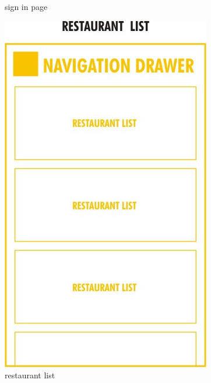 \documentclass[12pt]{article}
\begin{document}
\begin{figure}
\caption{sign in page}
\includegraphics[scale=0.4]{milestone2/6.jpeg}
\caption{restaurant list}


\end{figure}
\end{document}
